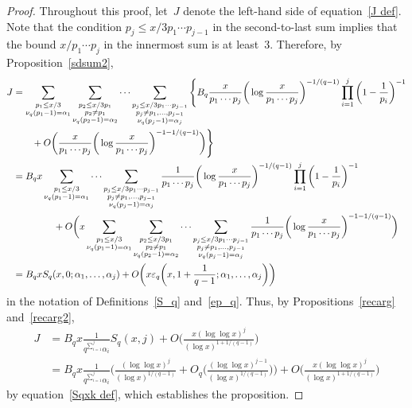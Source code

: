 \documentclass[12pt,reqno]{amsart}
\theoremstyle{definition}
\newcommand{\ep}{\varepsilon}
\begin{document}
\begin{proof}
Throughout this proof, let~$J$ denote the left-hand side of equation~\eqref{J def}.
Note that the condition $p_j\le x/3p_1\cdots p_{j-1}$ in the second-to-last sum implies that the bound $x/p_1\cdots p_j$ in the innermost sum is at least~$3$. Therefore, by Proposition~\ref{sdsum2},
\begin{align*}
J&=\sum_{\substack{p_1\le x/3\\\nu_q(p_1-1)=\alpha_1}}\sum_{\substack{p_2\le x/3p_1\\p_2\ne p_1\\\nu_q(p_2-1)=\alpha_2}}\cdots \sum_{\substack{p_j\le x/3p_1\cdots p_{j-1}\\p_j\ne p_1,\ldots,p_{j-1}\\\nu_q(p_j-1)=\alpha_j}}\Bigg\{ B_q\frac x{p_1\cdots p_j} \bigg( \log\frac x{p_1\cdots p_j}\bigg)^{-1/(q-1)} \prod_{i=1}^j\bigg(1-\frac 1{p_i}\bigg)^{-1} \\
&\qquad{}+O\bigg( \frac x{p_1\cdots p_j}\bigg( \log\frac x{p_1 \cdots p_j}\bigg)^{-1-1/(q-1)}\bigg) \Bigg\} \\
&=B_q x\sum_{\substack{p_1\le x/3\\\nu_q(p_1-1)=\alpha_1}}\cdots \sum_{\substack{p_j\le x/3p_1\cdots p_{j-1}\\p_j\ne p_1,\ldots,p_{j-1}\\\nu_q(p_j-1)=\alpha_j}}\frac 1{p_1\cdots p_j} \bigg( \log\frac x{p_1\cdots p_j}\bigg)^{-1/(q-1)}\prod_{i=1}^j\bigg(1-\frac 1{p_i}\bigg)^{-1}\\
&\hspace{1.5cm}+O\bigg(x\sum_{\substack{p_1\le x/3\\\nu_q(p_1-1)=\alpha_1}}\sum_{\substack{p_2\le x/3p_1\\p_2\ne p_1\\\nu_q(p_2-1)=\alpha_2}}\cdots \sum_{\substack{p_j\le x/3p_1\cdots p_{j-1}\\p_j\ne p_1,\ldots,p_{j-1}\\\nu_q(p_j-1)=\alpha_j}}\frac 1{p_1\cdots p_j}\bigg( \log\frac x{p_1 \cdots p_j}\bigg)^{-1-1/(q-1)}\bigg) \\
&=B_qx S_q(x,0;\alpha_1,\dots,\alpha_j) + O\bigg( x \ep_q\bigg( x,1+\frac1{q-1};\alpha_1,\dots,\alpha_j \bigg) \bigg)
\end{align*}
in the notation of Definitions~\ref{S_q} and~\ref{ep_q}. Thus, by Propositions~\ref{recarg} and~\ref{recarg2},
\begin{align*}
J &= B_qx \frac1{q^{\sum_{i=1}^j} \alpha_i} S_q(x,j) + O\bigg( \frac{x (\log\log x)^j}{(\log x)^{1+1/(q-1)}} \bigg) \\
&= B_qx \frac1{q^{\sum_{i=1}^j} \alpha_i} \bigg( \frac{(\log\log x)^j}{(\log x)^{1/(q-1)}}+O_q\bigg( \frac{(\log\log x)^{j-1}}{(\log x)^{1/(q-1)}}\bigg) \bigg) + O\bigg( \frac{x (\log\log x)^j}{(\log x)^{1+1/(q-1)}} \bigg)
\end{align*}
by equation~\eqref{Sqxk def}, which establishes the proposition.
\end{proof}
\end{document}
